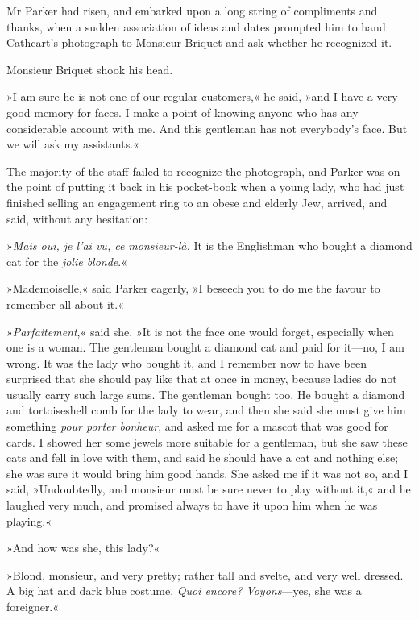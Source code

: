 Mr Parker had risen, and embarked upon a long string of compliments and thanks, when a sudden association of ideas and dates prompted him to hand Cathcart's photograph to Monsieur Briquet and ask whether he recognized it.

Monsieur Briquet shook his head.

»I am sure he is not one of our regular customers,« he said, »and I have a very good memory for faces. I make a point of knowing anyone who has any considerable account with me. And this gentleman has not everybody's face. But we will ask my assistants.«

The majority of the staff failed to recognize the photograph, and Parker was on the point of putting it back in his pocket-book when a young lady, who had just finished selling an engagement ring to an obese and elderly Jew, arrived, and said, without any hesitation:

»\foreignlanguage{french}{\textit{Mais oui, je l'ai vu, ce monsieur-là.}} It is the Englishman who bought a diamond cat for the \foreignlanguage{french}{\textit{jolie blonde}}.«

»Mademoiselle,« said Parker eagerly, »I beseech you to do me the favour to remember all about it.«

»\foreignlanguage{french}{\textit{Parfaitement},}« said she. »It is not the face one would forget, especially when one is a woman. The gentleman bought a diamond cat and paid for it\allowbreak---\allowbreak no, I am wrong. It was the lady who bought it, and I remember now to have been surprised that she should pay like that at once in money, because ladies do not usually carry such large sums. The gentleman bought too. He bought a diamond and tortoiseshell comb for the lady to wear, and then she said she must give him something \foreignlanguage{french}{\textit{pour porter bonheur}}, and asked me for a mascot that was good for cards. I showed her some jewels more suitable for a gentleman, but she saw these cats and fell in love with them, and said he should have a cat and nothing else; she was sure it would bring him good hands. She asked me if it was not so, and I said, »Undoubtedly, and monsieur must be sure never to play without it,« and he laughed very much, and promised always to have it upon him when he was playing.«

»And how was she, this lady?«

»Blond, monsieur, and very pretty; rather tall and svelte, and very well dressed. A big hat and dark blue costume. \foreignlanguage{french}{\textit{Quoi encore? Voyons}}---yes, she was a foreigner.«

